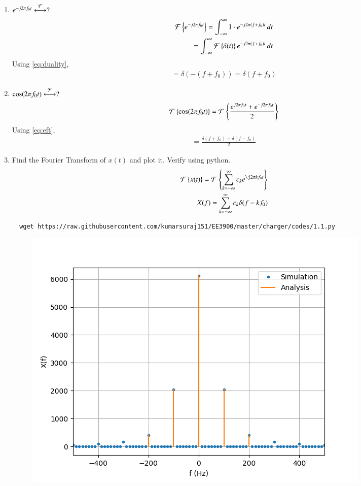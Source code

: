 \documentclass[journal,12pt,twocolumn]{IEEEtran}
\renewcommand\thesection{\arabic{section}}
\begin{document}
\begin{enumerate}[label=\thesection.\arabic*
,ref=\thesection.\theenumi]
\begin{align}
 \end{align}
 Since $e^{-j2\pi ft}=1$ for t=0 and remaining integrand is zero for t $\neq0$.
 \begin{align}
  =\int_{-\infty}^{\infty}\delta(t)\,dt\\
  =1
 \end{align}
 \item $e^{-j2\pi f_0t}\overset{\mathcal{F}}{ \longleftrightarrow}?$\\
 \solution 
 \begin{align}
 \mathcal{F}\left\{e^{-j2\pi f_0t}\right\}=\int_{-\infty}^{\infty}1\cdot e^{-j2\pi\left(f+f_0\right)t}\,dt\\
 =\int_{-\infty}^{\infty}\mathcal{F}\left\{\delta(t)\right\} e^{-j2\pi\left(f+f_0\right)t}\,dt
 \end{align}
 Using \eqref{eq:duality},
 \begin{align}
 \label{eq:eft}
 =\delta(-(f+f_0))=\delta(f+f_0)
 \end{align}
 \item $\cos(2\pi f_0t)\overset{\mathcal{F}}{ \longleftrightarrow}?$\\
 \solution
 \begin{align}
 \mathcal{F}\left\{\cos(2\pi f_0t)\right\}=\mathcal{F}\left\{\frac{{e^{j2\pi f_0t}+e^{-j2\pi f_0t}}}{2}\right\}
 \end{align}
 Using \eqref{eq:eft},
 \begin{align}
 =\frac{\delta(f+f_0)+\delta(f-f_0)}{2}
 \end{align}
 \item Find the Fourier Transform of $x(t)$ and plot it.  Verify using python.\\
 \solution
 \begin{align}
  \foutranin{x(t)}=\foutranin{\sum_{k = -\infty}^{\infty}c_ke^{\j2\pi kf_0 t}}\\
  X(f)=\sum_{k = -\infty}^{\infty}c_k\delta(f-kf_0)
  \end{align}
  \begin{lstlisting}
  wget https://raw.githubusercontent.com/kumarsuraj151/EE3900/master/charger/codes/1.1.py
  \end{lstlisting}
  \begin{figure}[!ht]
    \centering
    \includegraphics[width=\columnwidth]{./figs/3.8}

\end{figure}
\end{enumerate}
\end{document}
